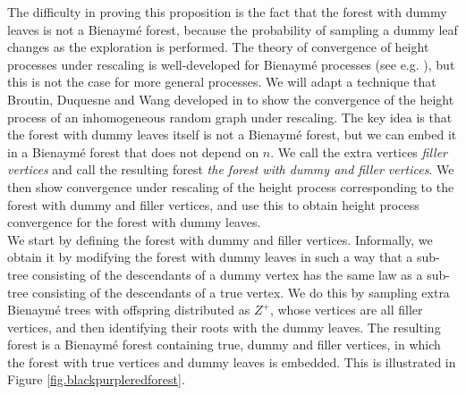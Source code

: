 The difficulty in proving this proposition is the fact that the forest with dummy leaves is not a Bienaymé forest, because the probability of sampling a dummy leaf changes as the exploration is performed. The theory of convergence of height processes under rescaling is well-developed for Bienaymé processes (see e.g. \citet{AST_2002__281__R1_0}), but this is not the case for more general processes.  We will adapt a technique that Broutin, Duquesne and Wang developed in \cite{broutinLimitsMultiplicativeInhomogeneous2020} to show the convergence of the height process of an inhomogeneous random graph under rescaling. The key idea is that  the forest with dummy leaves itself is not a Bienaymé forest, but we can embed it in a Bienaymé forest that does not depend on $n$. We call the extra vertices \emph{filler vertices} and call the resulting forest \emph{the forest with dummy and filler vertices}. We then show convergence under rescaling of the height process corresponding to the forest with dummy and filler vertices, and use this to obtain height process convergence for the forest with dummy leaves. \\
We start by defining the forest with dummy and filler vertices. Informally, we obtain it by modifying the forest with dummy leaves in such a way that a sub-tree consisting of the descendants of a dummy vertex has the same law as a sub-tree consisting of the descendants of a true vertex. We do this by sampling extra Bienaymé trees with offspring distributed as $Z^+$, whose vertices are all filler vertices, and then identifying their roots with the dummy leaves. The resulting forest is a Bienaymé forest containing true, dummy and filler vertices, in which the forest with true vertices and dummy leaves is embedded. This is illustrated in Figure \ref{fig.blackpurpleredforest}. 

